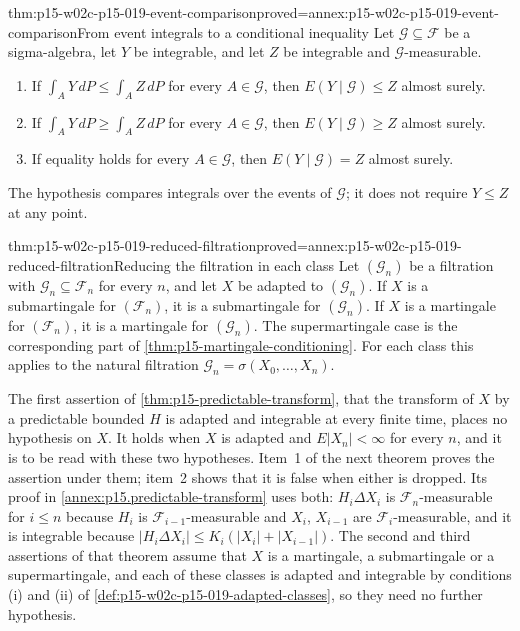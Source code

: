 \begin{hblemma}{thm:p15-w02c-p15-019-event-comparison}{proved=annex:p15-w02c-p15-019-event-comparison}{From event integrals to a conditional inequality}
Let \(\mathcal G\subseteq\mathcal F\) be a sigma-algebra, let \(Y\) be
integrable, and let \(Z\) be integrable and \(\mathcal G\)-measurable.
\begin{enumerate}
\item If \(\int_AY\,dP\leq\int_AZ\,dP\) for every \(A\in\mathcal G\),
      then \(E(Y\mid\mathcal G)\leq Z\) almost surely.
\item If \(\int_AY\,dP\geq\int_AZ\,dP\) for every \(A\in\mathcal G\),
      then \(E(Y\mid\mathcal G)\geq Z\) almost surely.
\item If equality holds for every \(A\in\mathcal G\), then
      \(E(Y\mid\mathcal G)=Z\) almost surely.
\end{enumerate}
The hypothesis compares integrals over the events of \(\mathcal G\); it
does not require \(Y\leq Z\) at any point.
\end{hblemma}

\begin{hbtheorem}{thm:p15-w02c-p15-019-reduced-filtration}{proved=annex:p15-w02c-p15-019-reduced-filtration}{Reducing the filtration in each class}
Let \((\mathcal G_n)\) be a filtration with
\(\mathcal G_n\subseteq\mathcal F_n\) for every \(n\), and let \(X\) be
adapted to \((\mathcal G_n)\).
If \(X\) is a submartingale for \((\mathcal F_n)\), it is a submartingale
for \((\mathcal G_n)\). If \(X\) is a martingale for \((\mathcal F_n)\),
it is a martingale for \((\mathcal G_n)\). The supermartingale case is
the corresponding part of \cref{thm:p15-martingale-conditioning}.
For each class this applies to the natural filtration
\(\mathcal G_n=\sigma(X_0,\ldots,X_n)\).
\end{hbtheorem}

The first assertion of \cref{thm:p15-predictable-transform}, that the
transform of \(X\) by a predictable bounded \(H\) is adapted and
integrable at every finite time, places no hypothesis on \(X\). It holds
when \(X\) is adapted and \(E|X_n|<\infty\) for every \(n\), and it is to
be read with these two hypotheses. Item~1 of the next theorem proves the
assertion under them; item~2 shows that it is false when either is
dropped. Its proof in \cref{annex:p15.predictable-transform} uses both:
\(H_i\Delta X_i\) is \(\mathcal F_n\)-measurable for \(i\leq n\) because
\(H_i\) is \(\mathcal F_{i-1}\)-measurable and \(X_i\), \(X_{i-1}\) are
\(\mathcal F_i\)-measurable, and it is integrable because
\(|H_i\Delta X_i|\leq K_i(|X_i|+|X_{i-1}|)\). The second and third
assertions of that theorem assume that \(X\) is a martingale, a
submartingale or a supermartingale, and each of these classes is adapted
and integrable by conditions (i) and (ii) of
\cref{def:p15-w02c-p15-019-adapted-classes}, so they need no further
hypothesis.

